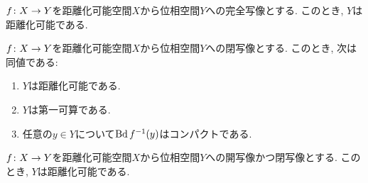 \documentclass[uplatex, dvipdfmx, a4paper, 12pt, class=jsbook, crop=false]{standalone}
\begin{document}
\begin{proposition}
	$ f\colon X\to Y $を距離化可能空間$ X $から位相空間$ Y $への完全写像とする.
	このとき, $ Y $は距離化可能である.
\end{proposition}

\begin{theorem}
	$ f\colon X\to Y $を距離化可能空間$ X $から位相空間$ Y $への閉写像とする.
	このとき, 次は同値である:
	\begin{enumerate}
		\item $ Y $は距離化可能である.
		\item $ Y $は第一可算である.
		\item 任意の$ y \in Y $について$ \topbd \mapinvpt{f}{y} $はコンパクトである.
	\end{enumerate}
\end{theorem}

\begin{proposition}
	$ f\colon X\to Y $を距離化可能空間$ X $から位相空間$ Y $への開写像かつ閉写像とする.
	このとき, $ Y $は距離化可能である.
\end{proposition}
\end{document}
